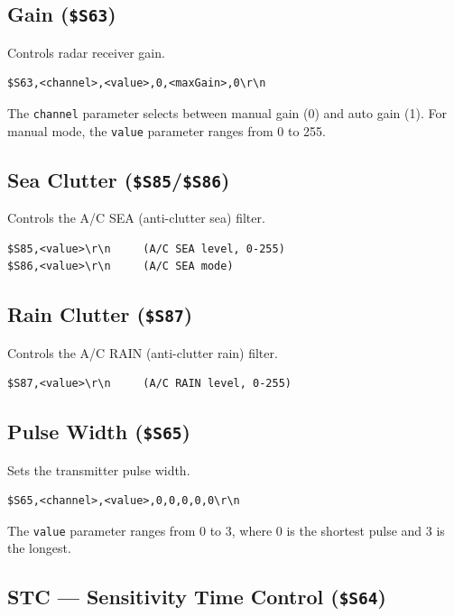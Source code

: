 \documentclass[11pt,letterpaper]{article}
\begin{document}
\subsection{Gain (\texttt{\$S63})}

Controls radar receiver gain.

\begin{lstlisting}
$S63,<channel>,<value>,0,<maxGain>,0\r\n
\end{lstlisting}

The \texttt{channel} parameter selects between manual gain (0) and auto gain (1). For manual mode, the \texttt{value} parameter ranges from 0 to 255.


\subsection{Sea Clutter (\texttt{\$S85}/\texttt{\$S86})}

Controls the A/C SEA (anti-clutter sea) filter.

\begin{lstlisting}
$S85,<value>\r\n     (A/C SEA level, 0-255)
$S86,<value>\r\n     (A/C SEA mode)
\end{lstlisting}


\subsection{Rain Clutter (\texttt{\$S87})}

Controls the A/C RAIN (anti-clutter rain) filter.

\begin{lstlisting}
$S87,<value>\r\n     (A/C RAIN level, 0-255)
\end{lstlisting}


\subsection{Pulse Width (\texttt{\$S65})}

Sets the transmitter pulse width.

\begin{lstlisting}
$S65,<channel>,<value>,0,0,0,0,0\r\n
\end{lstlisting}

The \texttt{value} parameter ranges from 0 to 3, where 0 is the shortest pulse and 3 is the longest.


\subsection{STC --- Sensitivity Time Control (\texttt{\$S64})}
\end{document}
